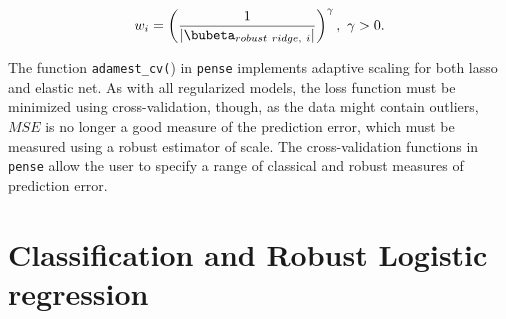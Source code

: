 \documentclass[graybox,envcountchap,sectrefs]{svmono}\usepackage[]{graphicx}\usepackage[]{xcolor}
\begin{document}
\begin{appendices}
\begin{equation}
w_{i}=\left(\frac{1}{\left|\bubeta_{robust\ ridge,\ i}\right|}\right)^{\gamma},\ \gamma>0.\label{eq:AdaptiveElasticNetWeights-1}
\end{equation}

The function \texttt{adamest\_cv(}) in \texttt{pense} implements adaptive
scaling for both lasso and elastic net. As with all regularized models,
the loss function must be minimized using cross-validation, though,
as the data might contain outliers, $MSE$ is no longer a good measure
of the prediction error, which must be measured using a robust estimator
of scale. The cross-validation functions in \texttt{pense} allow the
user to specify a range of classical and robust measures of prediction
error. 


\section{Classification and Robust Logistic regression }


\end{appendices}
\end{document}
